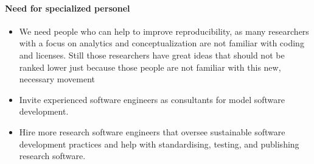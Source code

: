 \documentclass{article}
\begin{document}
\paragraph{Need for specialized personel}
\begin{itemize}
	\item We need people who can help to improve reproducibility, as many researchers with a focus on analytics and conceptualization are not familiar with coding and licenses. Still those researchers have great ideas that should not be ranked lower just because those people are not familiar with this new, necessary movement
	\item Invite experienced software engineers as consultants for model software development.
	\item Hire more research software engineers that oversee sustainable software development practices and help with standardising, testing, and publishing research software.
\end{itemize}
\end{document}
